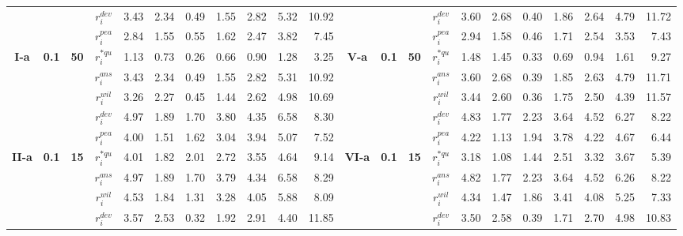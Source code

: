 \documentclass[11pt,authoryear,review,3p,times]{elsarticle}
\newcommand{\dev}{$r_i^{dev}$}
\newcommand{\pea}{$r_i^{pea}$}
\newcommand{\wil}{$r_i^{wil}$}
\newcommand{\aasc}{$r_i^{ans}$}
\newcommand{\aqu}{$r_i^{*qu}$}
\begin{document}
\begin{landscape}
\begin{table}
{\begin{tabular}{ccccrrrrrrr|rrrrrrrrrrr}
	\hline
	&       &       & \dev  & 3.43  & 2.34  & 0.49  & 1.55  & 2.82  & 5.32  & 10.92 &       &       &       & \multicolumn{1}{c}{\dev} & 3.60  & 2.68  & 0.40  & 1.86  & 2.64  & 4.79  & 11.72 \\
	&       &       & \pea  & 2.84  & 1.55  & 0.55  & 1.62  & 2.47  & 3.82  & 7.45  &       &       &       & \multicolumn{1}{c}{\pea} & 2.94  & 1.58  & 0.46  & 1.71  & 2.54  & 3.53  & 7.43 \\
	\textbf{I-a} & \textbf{0.1} & \textbf{50} & \aqu  & 1.13  & 0.73  & 0.26  & 0.66  & 0.90  & 1.28  & 3.25  & \multicolumn{1}{c}{\textbf{V-a}} & \multicolumn{1}{c}{\textbf{0.1}} & \multicolumn{1}{c}{\textbf{50}} & \multicolumn{1}{c}{\aqu} & 1.48  & 1.45  & 0.33  & 0.69  & 0.94  & 1.61  & 9.27 \\
	&       &       & \aasc & 3.43  & 2.34  & 0.49  & 1.55  & 2.82  & 5.31  & 10.92 &       &       &       & \multicolumn{1}{c}{\aasc} & 3.60  & 2.68  & 0.39  & 1.85  & 2.63  & 4.79  & 11.71 \\
	&       &       & \wil  & 3.26  & 2.27  & 0.45  & 1.44  & 2.62  & 4.98  & 10.69 &       &       &       & \multicolumn{1}{c}{\wil} & 3.44  & 2.60  & 0.36  & 1.75  & 2.50  & 4.39  & 11.57 \\
	\hline
	&       &       & \dev  & 4.97  & 1.89  & 1.70  & 3.80  & 4.35  & 6.58  & 8.30  &       &       &       & \multicolumn{1}{c}{\dev} & 4.83  & 1.77  & 2.23  & 3.64  & 4.52  & 6.27  & 8.22 \\
	&       &       & \pea  & 4.00  & 1.51  & 1.62  & 3.04  & 3.94  & 5.07  & 7.52  &       &       &       & \multicolumn{1}{c}{\pea} & 4.22  & 1.13  & 1.94  & 3.78  & 4.22  & 4.67  & 6.44 \\
	\textbf{II-a} & \textbf{0.1} & \textbf{15} & \aqu  & 4.01  & 1.82  & 2.01  & 2.72  & 3.55  & 4.64  & 9.14  & \multicolumn{1}{c}{\textbf{VI-a}} & \multicolumn{1}{c}{\textbf{0.1}} & \multicolumn{1}{c}{\textbf{15}} & \multicolumn{1}{c}{\aqu} & 3.18  & 1.08  & 1.44  & 2.51  & 3.32  & 3.67  & 5.39 \\
	&       &       & \aasc & 4.97  & 1.89  & 1.70  & 3.79  & 4.34  & 6.58  & 8.29  &       &       &       & \multicolumn{1}{c}{\aasc} & 4.82  & 1.77  & 2.23  & 3.64  & 4.52  & 6.26  & 8.22 \\
	&       &       & \wil  & 4.53  & 1.84  & 1.31  & 3.28  & 4.05  & 5.88  & 8.09  &       &       &       & \multicolumn{1}{c}{\wil} & 4.34  & 1.47  & 1.86  & 3.41  & 4.08  & 5.25  & 7.33 \\
	\hline
	&       &       & \dev  & 3.57  & 2.53  & 0.32  & 1.92  & 2.91  & 4.40  & 11.85 &       &       &       & \multicolumn{1}{c}{\dev} & 3.50  & 2.58  & 0.39  & 1.71  & 2.70  & 4.98  & 10.83 \\

\end{tabular}}
\end{table}
\end{landscape}
\end{document}
